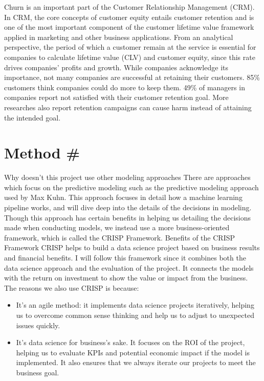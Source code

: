 Churn is an important part of the Customer Relationship Management (CRM). In CRM, the core concepts of customer equity entails customer retention and is one of the most important component of the customer lifetime value framework applied in marketing and other business applications. From an analytical perspective, the period of which a customer remain at the service is essential for companies to calculate lifetime value (CLV) and customer equity, since this rate drives companies' profits and growth. While companies acknowledge its importance, not many companies are successful at retaining their customers. 85\% customers think companies could do more to keep them. 49\% of managers in companies report not satisfied with their customer retention goal. More researches also report retention campaigns can cause harm instead of attaining the intended goal.

\part{Method \#}
\label{method}

Why doesn't this project use other modeling approaches
There are approaches which focus on the predictive modeling such as the predictive modeling approach used by Max Kuhn. This approach focuses in detail how a machine learning pipeline works, and will dive deep into the details of the decisions in modeling. Though this approach has certain benefits in helping us detailing the decisions made when conducting models, we instead use a more business-oriented framework, which is called the CRISP Framework.
Benefits of the CRISP Framework
CRISP helps to build a data science project based on business results and financial benefits. I will follow this framework since it combines both the data science approach and the evaluation of the project. It connects the models with the return on investment to show the value or impact from the business. The reasons we also use CRISP is because:

\begin{itemize}
\item It's an agile method: it implements data science projects iteratively, helping us to overcome common sense thinking and help us to adjust to unexpected issues quickly.

\item It's data science for business's sake. It focuses on the ROI of the project, helping us to evaluate KPIs and potential economic impact if the model is implemented. It also ensures that we always iterate our projects to meet the business goal.

\end{itemize}

